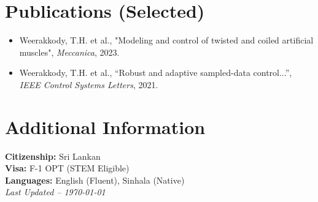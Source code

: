 \documentclass[letterpaper,10pt]{article}
\begin{document}
\section*{Publications (Selected) \hrulefill}
\begin{itemize}[leftmargin=1em]
    \item Weerakkody, T.H. et al., "Modeling and control of twisted and coiled artificial muscles", \textit{Meccanica}, 2023.
    \item Weerakkody, T.H. et al., “Robust and adaptive sampled-data control...”, \textit{IEEE Control Systems Letters}, 2021.
\end{itemize}

\section*{Additional Information \hrulefill}
\textbf{Citizenship:} Sri Lankan \\
\textbf{Visa:} F-1 OPT (STEM Eligible) \\
\textbf{Languages:} English (Fluent), Sinhala (Native) \\

\vspace{0.5em}
\textit{Last Updated – \today}
\end{document}
